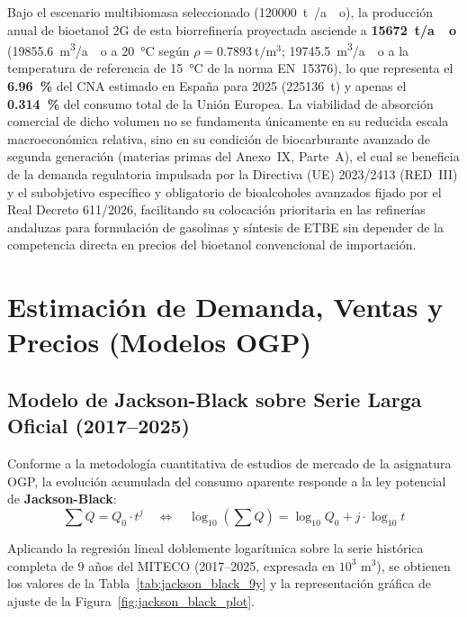 \documentclass{report}
\begin{document}
Bajo el escenario multibiomasa seleccionado (\SI{120000}{\tonne{}/ao}), la producción anual de bioetanol 2G de esta biorrefinería proyectada asciende a \textbf{\SI{15672}{\tonne/ao}} (\SI{19855.6}{\cubic\meter/ao} a \SI{20}{\celsius} según $\rho = \SI{0.7893}{\tonne/\cubic\meter}$; \SI{19745.5}{\cubic\meter/ao} a la temperatura de referencia de \SI{15}{\celsius} de la norma EN~15376), lo que representa el \textbf{\SI{6.96}{\percent}} del CNA estimado en España para 2025 (\num{225136}~t) y apenas el \textbf{\SI{0.314}{\percent}} del consumo total de la Unión Europea. La viabilidad de absorción comercial de dicho volumen no se fundamenta únicamente en su reducida escala macroeconómica relativa, sino en su condición de biocarburante avanzado de segunda generación (materias primas del Anexo~IX, Parte~A), el cual se beneficia de la demanda regulatoria impulsada por la Directiva (UE) 2023/2413 (RED~III) y el subobjetivo específico y obligatorio de bioalcoholes avanzados fijado por el Real Decreto 611/2026, facilitando su colocación prioritaria en las refinerías andaluzas para formulación de gasolinas y síntesis de ETBE sin depender de la competencia directa en precios del bioetanol convencional de importación.

\chapter{Estimación de Demanda, Ventas y Precios (Modelos OGP)}

\section{Modelo de Jackson-Black sobre Serie Larga Oficial (2017--2025)}
Conforme a la metodología cuantitativa de estudios de mercado de la asignatura OGP, la evolución acumulada del consumo aparente responde a la ley potencial de \textbf{Jackson-Black}:
\begin{equation}
    \sum Q = Q_0 \cdot t^j \quad \Longleftrightarrow \quad \log_{10}\left(\sum Q\right) = \log_{10} Q_0 + j \cdot \log_{10} t
    \label{eq:jackson_black}
\end{equation}

Aplicando la regresión lineal doblemente logarítmica sobre la serie histórica completa de 9 años del MITECO (2017--2025, expresada en $10^3\text{ m}^3$), se obtienen los valores de la Tabla~\ref{tab:jackson_black_9y} y la representación gráfica de ajuste de la Figura~\ref{fig:jackson_black_plot}.
\end{document}
